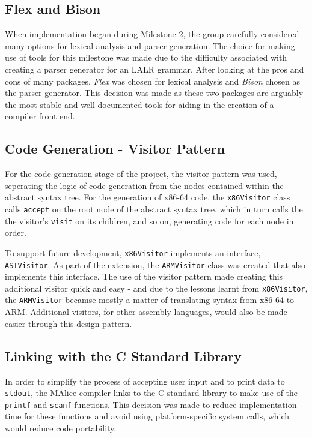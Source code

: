 \documentclass[a4wide, 11pt]{article}
\begin{document}
\subsection{Flex and Bison}

When implementation began during Milestone 2, the group carefully considered
many options for lexical analysis and parser generation. The choice for making 
use of tools for this milestone was made due to the difficulty associated with
creating a parser generator for an LALR grammar. After looking at the
pros and cons of many packages, \emph{Flex} was chosen for lexical analysis
and \emph{Bison} chosen as the parser generator. This decision was made as 
these two packages are arguably the most stable and well documented tools for 
aiding in the creation of a compiler front end.

\subsection{Code Generation - Visitor Pattern}

For the code generation stage of the project, the visitor pattern was used, 
seperating the logic of code generation from the nodes contained within the
abstract syntax tree. For the generation of x86-64 code, the \texttt{x86Visitor}
class calls \texttt{accept} on the root node of the abstract syntax tree, which
in turn calls the the visitor's \texttt{visit} on its children, and so on, 
generating code for each node in order. 

To support future development, \texttt{x86Visitor} implements an interface,
\texttt{ASTVisitor}. As part of the extension, the \texttt{ARMVisitor} class was
created that also implements this interface. The use of the visitor pattern
made creating this additional visitor quick and easy - and due to the lessons
learnt from \texttt{x86Visitor}, the \texttt{ARMVisitor} becamse mostly a
matter of translating syntax from x86-64 to ARM. Additional visitors, for other
assembly languages, would also be made easier through this design pattern.

\subsection{Linking with the C Standard Library}
In order to simplify the process of accepting user input and to print data to
\texttt{stdout}, the MAlice compiler links to the C standard library to make 
use of the \texttt{printf} and \texttt{scanf} functions. This decision was made
to reduce implementation time for these functions and avoid using 
platform-specific system calls, which would reduce code portability. 
\end{document}
